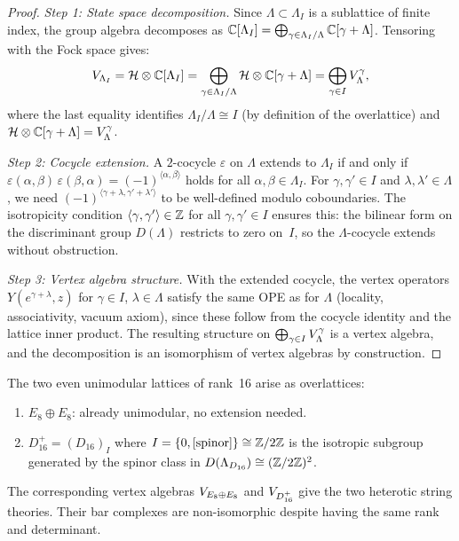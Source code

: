 \begin{proof}
\emph{Step 1: State space decomposition.}
Since $\Lambda \subset \Lambda_I$ is a sublattice of finite index,
the group algebra decomposes as
$\mathbb{C}[\Lambda_I] = \bigoplus_{\gamma \in \Lambda_I/\Lambda} \mathbb{C}[\gamma + \Lambda]$.
Tensoring with the Fock space gives:
\[
V_{\Lambda_I} = \mathcal{H} \otimes \mathbb{C}[\Lambda_I]
= \bigoplus_{\gamma \in \Lambda_I/\Lambda} \mathcal{H} \otimes \mathbb{C}[\gamma + \Lambda]
= \bigoplus_{\gamma \in I} V_\Lambda^\gamma,
\]
where the last equality identifies $\Lambda_I/\Lambda \cong I$ (by
definition of the overlattice) and
$\mathcal{H} \otimes \mathbb{C}[\gamma + \Lambda] = V_\Lambda^\gamma$.

\emph{Step 2: Cocycle extension.}
A $2$-cocycle $\varepsilon$ on $\Lambda$ extends to $\Lambda_I$ if
and only if $\varepsilon(\alpha,\beta)\,\varepsilon(\beta,\alpha) =
(-1)^{\langle\alpha,\beta\rangle}$ holds for all
$\alpha, \beta \in \Lambda_I$.  For $\gamma, \gamma' \in I$ and
$\lambda, \lambda' \in \Lambda$, we need
$(-1)^{\langle\gamma+\lambda, \gamma'+\lambda'\rangle}$ to be
well-defined modulo coboundaries.  The isotropicity condition
$\langle\gamma, \gamma'\rangle \in \mathbb{Z}$ for all
$\gamma, \gamma' \in I$ ensures this: the bilinear form on the
discriminant group $D(\Lambda)$ restricts to zero on~$I$, so the
$\Lambda$-cocycle extends without obstruction.

\emph{Step 3: Vertex algebra structure.}
With the extended cocycle, the vertex operators
$Y(e^{\gamma+\lambda}, z)$ for $\gamma \in I$, $\lambda \in \Lambda$
satisfy the same OPE as for $\Lambda$ (locality, associativity,
vacuum axiom), since these follow from the cocycle identity and the
lattice inner product.  The resulting structure on
$\bigoplus_{\gamma \in I} V_\Lambda^\gamma$ is a vertex algebra,
and the decomposition is an isomorphism of vertex algebras by
construction.
\end{proof}

\begin{example}\label{ex:lattice:heterotic}
The two even unimodular lattices of rank~16 arise as overlattices:
\begin{enumerate}[label=(\roman*)]
\item $E_8 \oplus E_8$: already unimodular, no extension needed.
\item $D_{16}^+ = (D_{16})_I$ where $I = \{0, [\text{spinor}]\} \cong \mathbb{Z}/2\mathbb{Z}$
  is the isotropic subgroup generated by the spinor class in
  $D(\Lambda_{D_{16}}) \cong (\mathbb{Z}/2\mathbb{Z})^2$.
\end{enumerate}
The corresponding vertex algebras $V_{E_8 \oplus E_8}$ and
$V_{D_{16}^+}$ give the two heterotic string theories. Their bar
complexes are non-isomorphic despite having the same rank and
determinant.
\end{example}

